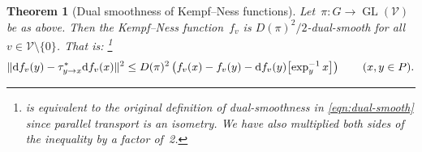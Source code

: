\documentclass[11pt,letterpaper]{article}
\newtheorem{theorem}{Theorem}[section]
\numberwithin{equation}{section}
\newcommand{\diff}{\mathrm{d}}
\newcommand{\VV}{\mathcal{V}}
\DeclareMathOperator{\GL}{GL}
\DeclarePairedDelimiter\norm{\lVert}{\rVert}
\begin{document}
\begin{theorem}[Dual smoothness of Kempf--Ness functions]\label{thm:kn-dual-smooth}
Let~$\pi \colon G \to \GL(\VV)$ be as above.
Then the Kempf--Ness function~$f_v$ is $D(\pi)^2/2$-dual-smooth for all~$v \in \VV\setminus\{0\}$.
That is:%
\footnote{ is equivalent to the original definition of dual-smoothness in \cref{eqn:dual-smooth} since parallel transport is an isometry. We have also multiplied both sides of the inequality by a factor of~2.}
\begin{equation}\label{eq:dual-smooth repeated}
    \norm{ \diff f_v(y) - \tau^{\ast}_{y \to x}\diff f_v(x) }^2 \leq D(\pi)^2 \left( f_v(x) - f_v(y) - \diff f_v(y)\mleft[\exp_{y}^{-1}x\mright]\right) \qquad (x,y\in P).
\end{equation}
\end{theorem}
\end{document}
